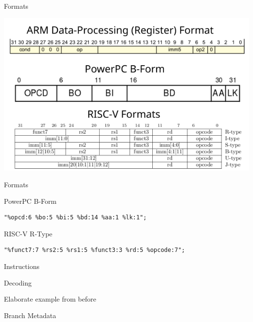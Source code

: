 \begin{frame}{Formats}

\centering
\includegraphics[width=\textwidth]{figures/formats}

\end{frame}

\begin{frame}[fragile]{Formats}

PowerPC B-Form

\begin{lstlisting}
"%opcd:6 %bo:5 %bi:5 %bd:14 %aa:1 %lk:1";
\end{lstlisting}

\bigskip

RISC-V R-Type

\begin{lstlisting}
"%funct7:7 %rs2:5 %rs1:5 %funct3:3 %rd:5 %opcode:7";
\end{lstlisting}

\end{frame}

\begin{frame}{Instructions}
\end{frame}

\begin{frame}{Decoding}

Elaborate example from before

\end{frame}

\begin{frame}{Branch Metadata}



\end{frame}
